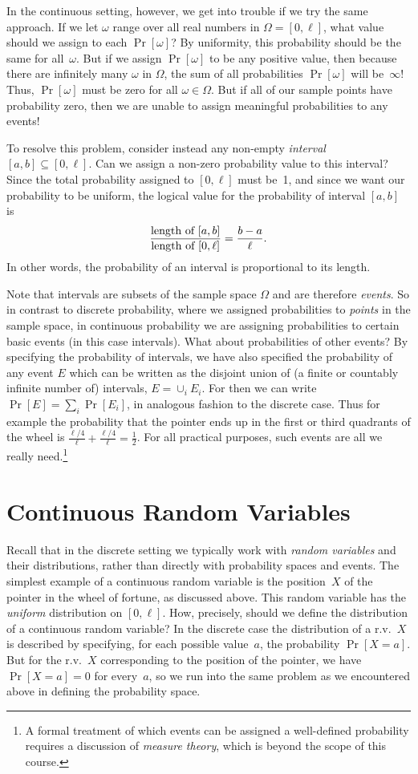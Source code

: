 \documentclass[11pt]{article}
\begin{document}
In the continuous setting, however, we get into trouble if we try the same approach.
If we let $\omega$ range over all real numbers in $\Omega = [0,\ell]$, what value should
we assign to each $\Pr[\omega]$?  By uniformity, this probability should be the
same for all~$\omega$. But if we assign $\Pr[\omega]$ to be any positive value, then
because there are infinitely many $\omega$ in $\Omega$,  the sum
of all probabilities $\Pr[\omega]$ will be~$\infty$! Thus, $\Pr[\omega]$ must be zero for all $\omega\in\Omega$.
But if all of our sample points have probability zero, then we are unable to assign meaningful probabilities
to any events!

To resolve this problem, consider instead any non-empty {\it interval\/} $[a,b]\subseteq[0,\ell]$.
Can we assign a non-zero probability value to this interval?  Since the total probability
assigned to $[0,\ell]$ must be~1, and since we want our probability to be uniform, the
logical value for the probability of interval $[a,b]$ is $$
   \frac{\hbox{\rm length of $[a,b]$}}{\hbox{\rm length of $[0,\ell]$}} = \frac{b-a}{\ell}.  $$
In other words, the probability of  an interval is proportional to its length.

Note that intervals are subsets of the sample space $\Omega$ and are
therefore {\em events}. So in contrast to discrete probability, where we assigned
probabilities to {\em points} in the sample space, in continuous probability we are
assigning probabilities to certain basic events (in this case intervals). What about probabilities of other events?
By specifying the probability of intervals, we have also
specified the probability of any event $E$ which can be written as
the disjoint union of (a finite or countably infinite number of)
intervals, $E=\cup_i E_i$. For then we can write $\Pr[E] = \sum_i
\Pr[E_i]$, in analogous fashion to the discrete case.  Thus for
example the probability that the pointer ends up in the first or
third quadrants of the wheel is
$\frac{\ell/4}{\ell}+\frac{\ell/4}{\ell} = \frac{1}{2}$. For all
practical purposes, such events are all we really need.\footnote{A
formal treatment of which events can be assigned a well-defined
probability requires a discussion of {\it measure theory}, which is
beyond the scope of this course.}


\section*{Continuous Random Variables}
Recall that in the discrete setting we typically work with {\it random variables\/} and
their distributions, rather than directly with probability spaces and events.  The simplest
example of a continuous random variable is the position~$X$ of the pointer in the
wheel of fortune, as discussed above.  This random variable has the {\it uniform\/}
distribution on $[0,\ell]$.  How, precisely, should we define the distribution of a
continuous random variable?  In the discrete case the distribution of a r.v.~$X$
is described by specifying, for each possible value~$a$, the probability $\Pr[X=a]$.
But for the r.v.~$X$ corresponding to the position of the pointer, we have $\Pr[X=a]=0$
for every~$a$, so we run into the same problem as we encountered above in defining
the probability space.
\end{document}
